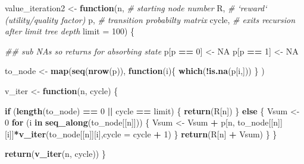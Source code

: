 \documentclass[]{book}
\newenvironment{Shaded}{\begin{snugshade}}{\end{snugshade}}
\newcommand{\CommentTok}[1]{\textcolor[rgb]{0.56,0.35,0.01}{\textit{#1}}}
\newcommand{\ControlFlowTok}[1]{\textcolor[rgb]{0.13,0.29,0.53}{\textbf{#1}}}
\newcommand{\DataTypeTok}[1]{\textcolor[rgb]{0.13,0.29,0.53}{#1}}
\newcommand{\DecValTok}[1]{\textcolor[rgb]{0.00,0.00,0.81}{#1}}
\newcommand{\KeywordTok}[1]{\textcolor[rgb]{0.13,0.29,0.53}{\textbf{#1}}}
\newcommand{\NormalTok}[1]{#1}
\newcommand{\OperatorTok}[1]{\textcolor[rgb]{0.81,0.36,0.00}{\textbf{#1}}}
\newcommand{\OtherTok}[1]{\textcolor[rgb]{0.56,0.35,0.01}{#1}}
\newcommand{\StringTok}[1]{\textcolor[rgb]{0.31,0.60,0.02}{#1}}
\begin{document}
\begin{Shaded}
\begin{Highlighting}[]
\NormalTok{value_iteration2 <-}\StringTok{ }\ControlFlowTok{function}\NormalTok{(n,        }\CommentTok{# starting node number}
\NormalTok{                             R,        }\CommentTok{# `reward` (utility/quality factor)}
\NormalTok{                             p,        }\CommentTok{# transition probabilty matrix}
\NormalTok{                             cycle,    }\CommentTok{# exits recursion after limit tree depth}
                             \DataTypeTok{limit =} \DecValTok{100}\NormalTok{) \{}
  
  \CommentTok{## sub NAs so returns for absorbing state}
\NormalTok{  p[p }\OperatorTok{==}\StringTok{ }\DecValTok{0}\NormalTok{] <-}\StringTok{ }\OtherTok{NA}
\NormalTok{  p[p }\OperatorTok{==}\StringTok{ }\DecValTok{1}\NormalTok{] <-}\StringTok{ }\OtherTok{NA}

\NormalTok{  to_node <-}\StringTok{ }\KeywordTok{map}\NormalTok{(}\KeywordTok{seq}\NormalTok{(}\KeywordTok{nrow}\NormalTok{(p)), }\ControlFlowTok{function}\NormalTok{(i)\{ }\KeywordTok{which}\NormalTok{(}\OperatorTok{!}\KeywordTok{is.na}\NormalTok{(p[i,])) \} )}
 
\NormalTok{  v_iter <-}\StringTok{ }\ControlFlowTok{function}\NormalTok{(n, cycle) \{}

    \ControlFlowTok{if}\NormalTok{ (}\KeywordTok{length}\NormalTok{(to_node) }\OperatorTok{==}\StringTok{ }\DecValTok{0} \OperatorTok{||}\StringTok{ }\NormalTok{cycle }\OperatorTok{==}\StringTok{ }\NormalTok{limit) \{}
      \KeywordTok{return}\NormalTok{(R[n])}
\NormalTok{    \}}
    \ControlFlowTok{else}\NormalTok{ \{}
\NormalTok{      Vsum <-}\StringTok{ }\DecValTok{0}   
      \ControlFlowTok{for}\NormalTok{ (i }\ControlFlowTok{in} \KeywordTok{seq_along}\NormalTok{(to_node[[n]])) \{}
\NormalTok{        Vsum <-}\StringTok{ }\NormalTok{Vsum }\OperatorTok{+}\StringTok{ }\NormalTok{p[n, to_node[[n]][i]]}\OperatorTok{*}\KeywordTok{v_iter}\NormalTok{(to_node[[n]][i],}\DataTypeTok{cycle =}\NormalTok{ cycle }\OperatorTok{+}\StringTok{ }\DecValTok{1}\NormalTok{)}
\NormalTok{      \}}
      \KeywordTok{return}\NormalTok{(R[n] }\OperatorTok{+}\StringTok{ }\NormalTok{Vsum)}
\NormalTok{    \}}
\NormalTok{  \}}
  
  \KeywordTok{return}\NormalTok{(}\KeywordTok{v_iter}\NormalTok{(n, cycle))}
\NormalTok{\}}
\end{Highlighting}
\end{Shaded}
\end{document}
